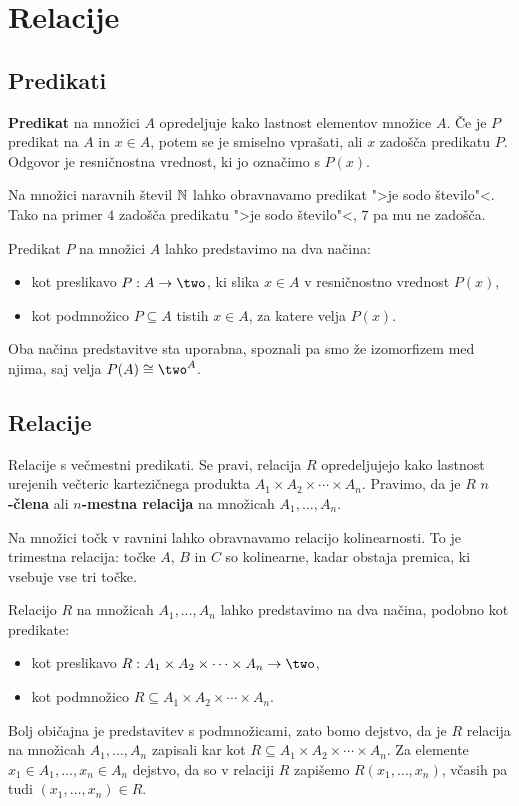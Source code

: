 \chapter{Relacije}

\section{Predikati}

\textbf{Predikat} na množici $A$ opredeljuje kako lastnost elementov množice $A$. Če
je $P$ predikat na $A$ in $x \in A$, potem se je smiselno vprašati, ali $x$
zadošča predikatu $P$. Odgovor je resničnostna vrednost, ki jo označimo s $P(x)$.

\begin{zgled}
  Na množici naravnih števil $\mathbb{N}$ lahko obravnavamo predikat ">je sodo
  število"<. Tako na primer $4$ zadošča predikatu ">je sodo število"<, $7$ pa mu ne zadošča.
\end{zgled}

Predikat $P$ na množici $A$ lahko predstavimo na dva načina:
%
\begin{itemize}
\item kot preslikavo $P : A \to \two$, ki slika $x \in A$ v resničnostno vrednost $P(x)$,
\item kot podmnožico $P \subseteq A$ tistih $x \in A$, za katere velja $P(x)$.
\end{itemize}
%
Oba načina predstavitve sta uporabna, spoznali pa smo že izomorfizem med njima,
saj velja $P(A) \iso \two^A$.

\section{Relacije}

Relacije s večmestni predikati. Se pravi, relacija $R$ opredeljujejo kako
lastnost urejenih večteric kartezičnega produkta $A_1 \times A_2 \times \cdots \times A_n$. Pravimo, da je $R$ \textbf{$n$-člena} ali \textbf{$n$-mestna relacija} na množicah $A_1, …, A_n$.

\begin{zgled}
  Na množici točk v ravnini lahko obravnavamo relacijo kolinearnosti.
  To je trimestna relacija: točke $A$, $B$ in $C$ so kolinearne, kadar obstaja
  premica, ki vsebuje vse tri točke.
\end{zgled}

Relacijo $R$ na množicah $A_1, \ldots, A_n$ lahko predstavimo na dva načina, podobno
kot predikate:
\begin{itemize}
\item kot preslikavo $R : A_1 \times A_2 \times \cdots \times A_n \to \two$,
\item kot podmnožico $R \subseteq A_1 \times A_2 \times \cdots \times A_n$.
\end{itemize}
%
Bolj običajna je predstavitev s podmnožicami, zato bomo dejstvo, da je $R$
relacija na množicah $A_1, \ldots, A_n$ zapisali kar kot $R \subseteq A_1 \times A_2 \times \cdots \times A_n$.
Za elemente $x_1 \in A_1, \ldots, x_n \in A_n$ dejstvo, da so v relaciji $R$ zapišemo
$R(x_1, \ldots, x_n)$, včasih pa tudi $(x_1, \ldots, x_n) \in R$.


